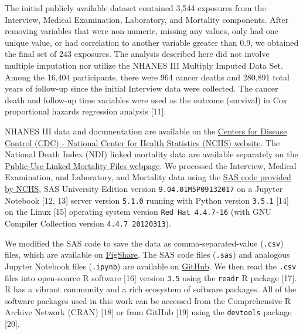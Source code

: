 \documentclass[12pt,oneside]{reedthesis}
\theoremstyle{definition}
\theoremstyle{definition}
\theoremstyle{definition}
\theoremstyle{remark}
\begin{document}
The initial publicly available dataset contained 3,544 exposures from
the Interview, Medical Examination, Laboratory, and Mortality
components. After removing variables that were non-numeric, missing any
values, only had one unique value, or had correlation to another
variable greater than 0.9, we obtained the final set of 243 exposures.
The analysis described here did not involve multiple imputation nor
utilize the NHANES III Multiply Imputed Data Set. Among the 16,404
participants, there were 964 cancer deaths and 280,891 total years of
follow-up since the initial Interview data were collected. The cancer
death and follow-up time variables were used as the outcome (survival)
in Cox proportional hazards regression analysis {[}11{]}.

NHANES III data and documentation are available on the
\href{https://wwwn.cdc.gov/nchs/nhanes/nhanes3/DataFiles.aspx}{Centers
for Disease Control (CDC) - National Center for Health Statistics (NCHS)
website}. The National Death Index (NDI) linked mortality data are
available separately on the
\href{https://www.cdc.gov/nchs/data-linkage/mortality-public.htm}{Public-Use
Linked Mortality Files webpage}. We processed the Interview, Medical
Examination, and Laboratory, and Mortality data using the
\href{https://wwwn.cdc.gov/nchs/nhanes/nhanes3/DataFiles.aspx}{SAS code
provided by NCHS}, SAS University Edition version
\texttt{9.04.01M5P09132017} on a Jupyter Notebook {[}12, 13{]} server
version \texttt{5.1.0} running with Python version \texttt{3.5.1}
{[}14{]} on the Linux {[}15{]} operating system version
\texttt{Red\ Hat\ 4.4.7-16} (with GNU Compiler Collection version
\texttt{4.4.7\ 20120313}).

We modified the SAS code to save the data as comma-separated-value
(\texttt{.csv}) files, which are available on
\href{https://figshare.com/articles/adult_csv/6210263}{FigShare}. The
SAS code files (\texttt{.sas}) and analogous Jupyter Notebook files
(\texttt{.ipynb}) are available on
\href{https://github.com/marskar/nhanes}{GitHub}. We then read the
\texttt{.csv} files into open-source R software {[}16{]} version
\texttt{3.5} using the \texttt{readr} R package {[}17{]}. R has a
vibrant community and a rich ecosystem of software packages. All of the
software packages used in this work can be accessed from the
Comprehensive R Archive Network (CRAN) {[}18{]} or from GitHub {[}19{]}
using the \texttt{devtools} package {[}20{]}.
\end{document}
